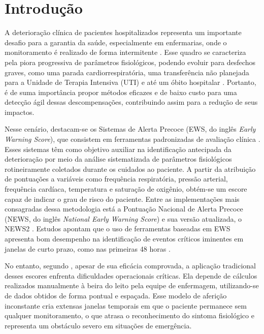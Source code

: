  \section{Introdução}

A deterioração clínica de pacientes hospitalizados representa um importante desafio para a garantia da saúde, especialmente em enfermarias, onde o monitoramento é realizado de forma intermitente \cite{vincent2018deterioracao}. Esse quadro se caracteriza pela piora progressiva de parâmetros fisiológicos, podendo evoluir para desfechos graves, como uma parada cardiorrespiratória, uma transferência não planejada para a Unidade de Terapia Intensiva (UTI) e até um óbito hospitalar \cite{gerry2020ews}. Portanto, é de suma importância propor métodos eficazes e de baixo custo para uma detecção ágil dessas descompensações, contribuindo assim para a redução de seus impactos.

Nesse cenário, destacam-se os Sistemas de Alerta Precoce (EWS, do inglês \textit{Early Warning Score}), que consistem em ferramentas padronizadas de avaliação clínica \cite{ALAM2014587}. Esses sistemas têm como objetivo auxiliar na identificação antecipada da deterioração por meio da análise sistematizada de parâmetros fisiológicos rotineiramente coletados durante os cuidados ao paciente. A partir da atribuição de pontuações a variáveis como frequência respiratória, pressão arterial, frequência cardíaca, temperatura e saturação de oxigênio, obtém-se um escore capaz de indicar o grau de risco do paciente. Entre as implementações mais consagradas dessa metodologia está a Pontuação Nacional de Alerta Precoce (NEWS, do inglês \textit{National Early Warning Score}) e sua versão atualizada, o NEWS2 \cite{gerry2020ews}. Estudos apontam que o uso de ferramentas baseadas em EWS apresenta bom desempenho na identificação de eventos críticos iminentes em janelas de curto prazo, como nas primeiras 48 horas \cite{smith2014ews}.

No entanto, segundo , apesar de sua eficácia comprovada, a aplicação tradicional desses escores enfrenta dificuldades operacionais críticas. Ela depende de cálculos realizados manualmente à beira do leito pela equipe de enfermagem, utilizando-se de dados obtidos de forma pontual e espaçada. Esse modelo de aferição inconstante cria extensas janelas temporais em que o paciente permanece sem qualquer monitoramento, o que atrasa o reconhecimento do sintoma fisiológico e representa um obstáculo severo em situações de emergência.

